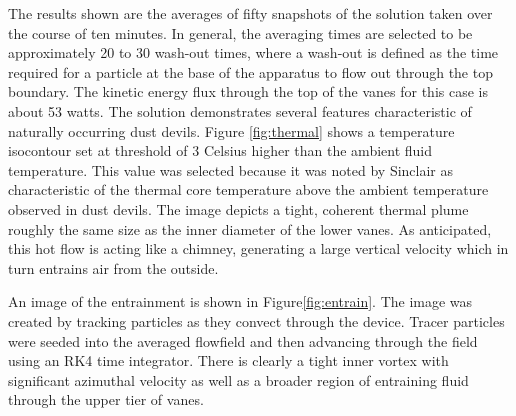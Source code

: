 

The results shown are the averages of fifty snapshots of the solution 
taken over the course of ten minutes. In general, the averaging times
are selected to be approximately 20 to 30 wash-out times, where a
wash-out is defined as the time required for a particle at the base of
the apparatus to flow out through the top boundary. The kinetic energy flux
through the top of the vanes for this case is about 53 watts. The solution
demonstrates several features characteristic of naturally occurring dust
devils. Figure \ref{fig:thermal} shows a temperature isocontour set at
threshold of 3 Celsius higher than the ambient fluid temperature. This
value was selected because it was noted by
Sinclair\cite{Sinclair1969} as characteristic of the thermal core
temperature above the ambient temperature observed in dust devils. The
image depicts a tight, coherent thermal 
plume roughly the same size as the inner diameter of the lower vanes. As
anticipated, this hot flow is acting like a chimney, generating a large
vertical velocity which in turn entrains air from the outside. 

An image of the entrainment is shown in Figure\ref{fig:entrain}. The
image was created by tracking particles as they 
convect through the device. Tracer particles were seeded into the
averaged flowfield and then advancing through 
the field using an RK4 time integrator.  There is clearly a tight inner
vortex with significant azimuthal velocity as well as a broader region
of entraining fluid through the upper tier of vanes.  

